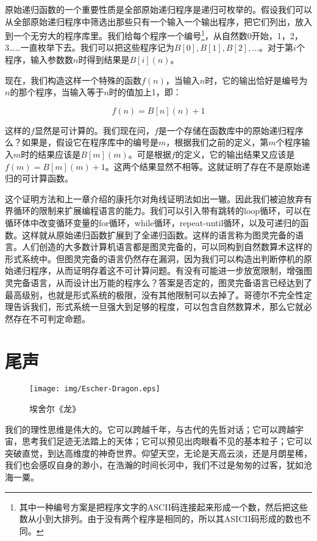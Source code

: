 \documentclass{article}
\begin{document}
原始递归函数的一个重要性质是全部原始递归程序是递归可枚举的。假设我们可以从全部原始递归程序中筛选出那些只有一个输入一个输出程序，把它们列出，放入到一个无穷大的程序库里。我们给每个程序一个编号\footnote{其中一种编号方案是把程序文字的ASCII码连接起来形成一个数，然后把这些数从小到大排列。由于没有两个程序是相同的，所以其ASICII码形成的数也不同。}，从自然数0开始，1，2，3……一直枚举下去。我们可以把这些程序记为$B[0], B[1], B[2], ...$。对于第$i$个程序，输入参数数$n$时得到结果是$B[i](n)$。

现在，我们构造这样一个特殊的函数$f(n)$，当输入$n$时，它的输出恰好是编号为$n$的那个程序，当输入等于$n$时的值加上1，即：

\[
f(n) = B[n](n) + 1
\]

这样的$f$显然是可计算的。我们现在问，$f$是一个存储在函数库中的原始递归程序么？如果是，假设它在程序库中的编号是$m$，根据我们之前的定义，第$m$个程序输入$m$时的结果应该是$B[m](m)$。可是根据$f$的定义，它的输出结果又应该是$f(m) = B[m](m) + 1$。这两个结果显然不相等。这就证明了存在不是原始递归的可计算函数。

这个证明方法和上一章介绍的康托尔对角线证明法如出一辙。因此我们被迫放弃有界循环的限制来扩展编程语言的能力。我们可以引入带有跳转的loop循环，可以在循环体中改变循环变量的for循环，while循环，repeat-until循环，以及可递归的函数。这样就从原始递归函数扩展到了全递归函数。这样的语言称为图灵完备的语言。人们创造的大多数计算机语言都是图灵完备的，可以同构到自然数算术这样的形式系统中。但图灵完备的语言仍然存在漏洞，因为我们可以构造出判断停机的原始递归程序，从而证明存着这不可计算问题。有没有可能进一步放宽限制，增强图灵完备语言，从而设计出万能的程序么？答案是否定的，图灵完备语言已经达到了最高级别，也就是形式系统的极限，没有其他限制可以去掉了。哥德尔不完全性定理告诉我们，形式系统一旦强大到足够的程度，可以包含自然数算术，那么它就必然存在不可判定命题。

\section{尾声}

\begin{wrapfigure}{R}{0.6\textwidth}
 \centering
 \texttt{[image: img/Escher-Dragon.eps]}
 \caption{埃舍尔《龙》}
 \label{fig:Escher-Dragon}
\end{wrapfigure}

我们的理性思维是伟大的。它可以跨越千年，与古代的先哲对话；它可以跨越宇宙，思考我们足迹无法踏上的天体；它可以预见出肉眼看不见的基本粒子；它可以突破直觉，到达高维度的神奇世界。仰望天空，无论是天高云淡，还是月朗星稀，我们也会感叹自身的渺小，在浩瀚的时间长河中，我们不过是匆匆的过客，犹如沧海一粟。
\end{document}
